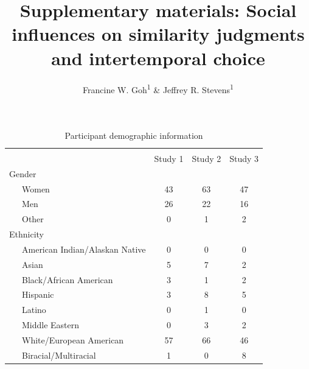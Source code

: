 \documentclass[
  doc,floatsintext]{apa6}
\title{Supplementary materials: Social influences on similarity judgments and intertemporal choice}
\author{Francine W. Goh\textsuperscript{1} \& Jeffrey R. Stevens\textsuperscript{1}}
\date{}
\affiliation{\vspace{0.5cm}\textsuperscript{1} University of Nebraska-Lincoln}
\begin{document}
\maketitle

\renewcommand{\thetable}{S\arabic{table}}
\setcounter{table}{0}
\renewcommand{\thefigure}{S\arabic{figure}}
\setcounter{figure}{0}
\setcounter{page}{1}

\newpage

\begin{table}[tbp]

\begin{center}
\begin{threeparttable}

\caption{\label{tab:unnamed-chunk-1}Participant demographic information}

\small{

\begin{tabular}{lccc}
\toprule
 & \multicolumn{2}{c}{} \\
\cmidrule(r){2-4}
 & Study 1 & Study 2 & Study 3\\
\midrule
Gender &  &  & \\
\ \ \ Women & 43 & 63 & 47\\
\ \ \ Men & 26 & 22 & 16\\
\ \ \ Other & 0 & 1 & 2\\
Ethnicity &  &  & \\
\ \ \ American Indian/Alaskan Native & 0 & 0 & 0\\
\ \ \ Asian & 5 & 7 & 2\\
\ \ \ Black/African American & 3 & 1 & 2\\
\ \ \ Hispanic & 3 & 8 & 5\\
\ \ \ Latino & 0 & 1 & 0\\
\ \ \ Middle Eastern & 0 & 3 & 2\\
\ \ \ White/European American & 57 & 66 & 46\\
\ \ \ Biracial/Multiracial & 1 & 0 & 8\\
\bottomrule
\end{tabular}

}

\end{threeparttable}
\end{center}

\end{table}

\clearpage
\end{document}
